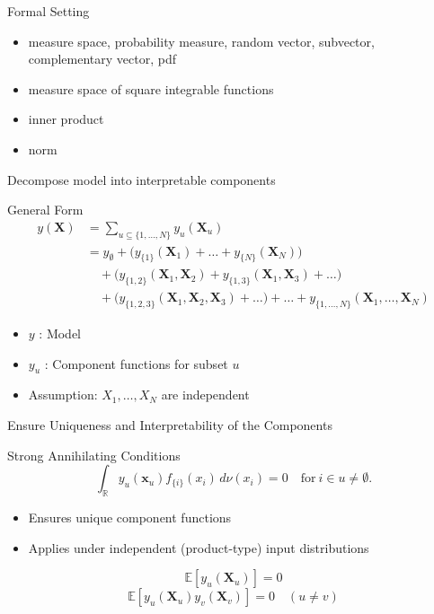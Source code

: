 \begin{frame}{Formal Setting}
  \begin{itemize}
    \item measure space, probability measure, random vector, subvector, complementary vector, pdf
    \item measure space of square integrable functions
    \item inner product
    \item norm
  \end{itemize}
  
\end{frame}

\begin{frame}{Decompose model into interpretable components} %
\begin{block}{General Form}
\[
  \begin{aligned}
    y(\boldsymbol{X}) 
    &= \sum_{u \subseteq \{1,\dots,N\}} y_{u}(\boldsymbol{X}_u) \\[3pt]
    &= y_{\emptyset} 
       + \big( y_{\{1\}}(\boldsymbol{X}_1) + \dots + y_{\{N\}}(\boldsymbol{X}_N) \big) \\[2pt]
    &\quad + \big( y_{\{1, 2\}}(\boldsymbol{X}_1,\boldsymbol{X}_2) 
                 + y_{\{1, 3\}}(\boldsymbol{X}_1,\boldsymbol{X}_3) + \dots \big) \\[2pt]
    &\quad + \big( y_{\{1, 2, 3\}}(\boldsymbol{X}_1,\boldsymbol{X}_2,\boldsymbol{X}_3) + \dots \big) 
       + \dots + y_{\{1, \dots, N\}}(\boldsymbol{X}_1, \dots, \boldsymbol{X}_N)
  \end{aligned}
\]
\end{block}

  \begin{itemize}
    \item $y$ : Model
    \item $y_u$ : Component functions for subset $u$
    \item Assumption: $X_1, \dots, X_N$ are independent
  \end{itemize}
\end{frame}

\begin{frame}{Ensure Uniqueness and Interpretability of the Components} %
  \begin{block}{Strong Annihilating Conditions}
    \[
      \int_{\mathbb{R}} y_u(\boldsymbol{x}_u) f_{\{i\}}(x_i) \, d\nu(x_i) = 0 \quad \text{for} \ i \in u \neq \emptyset.
    \]
  \end{block}
  \begin{itemize}
    \item Ensures unique component functions
    \item Applies under independent (product-type) input distributions
  \end{itemize}
    \[
    \mathbb{E}[y_u(\boldsymbol{X}_u)] = 0
  \]
  \[
    \mathbb{E}[y_u(\boldsymbol{X}_u) y_v(\boldsymbol{X}_v)] = 0 \quad (u \neq v)
  \]
\end{frame}



